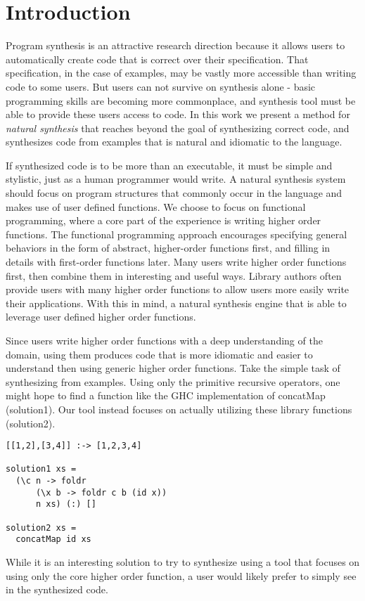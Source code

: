 \section{Introduction} 
\label{intro}

Program synthesis is an attractive research direction because it allows users to automatically create code that is correct over their specification. 
That specification, in the case of examples, may be vastly more accessible than writing code to some users.
But users can not survive on synthesis alone - basic programming skills are becoming more commonplace, and synthesis tool must be able to provide these users access to code.
In this work we present a method for \textit{natural synthesis} that reaches beyond the goal of synthesizing correct code, and synthesizes code from examples that is natural and idiomatic to the language. 

If synthesized code is to be more than an executable, it must be simple and stylistic, just as a human programmer would write.
A natural synthesis system should focus on program structures that commonly occur in the language and makes use of user defined functions.
We choose to focus on functional programming, where a core part of the experience is writing higher order functions.
The functional programming approach encourages specifying general behaviors in the form of abstract, higher-order functions first, and filling in details with first-order functions later.
Many users write higher order functions first, then combine them in interesting and useful ways.
Library authors often provide users with many higher order functions to allow users more easily write their applications.
With this in mind, a natural synthesis engine that is able to leverage user defined higher order functions.

Since users write higher order functions with a deep understanding of the domain, using them produces code that is more idiomatic and easier to understand then using generic higher order functions.
Take the simple task of synthesizing from examples. Using only the primitive recursive operators, one might hope to find a function like the GHC\cite{ghc} implementation of concatMap (solution1). Our tool instead focuses on actually utilizing these library functions (solution2).

\begin{lstlisting}
[[1,2],[3,4]] :-> [1,2,3,4]

solution1 xs = 
  (\c n -> foldr 
      (\x b -> foldr c b (id x))
      n xs) (:) []
      
solution2 xs =
  concatMap id xs
\end{lstlisting}
\noindent While it is an interesting solution to try to synthesize using a tool that focuses on using only the core higher order function, a user would likely prefer to simply see  in the synthesized code.

